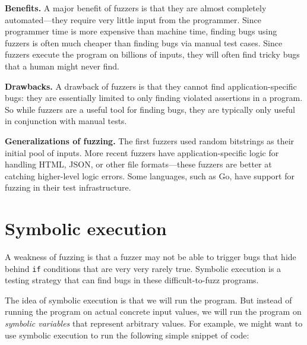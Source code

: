 \documentclass[
  letterpaper,
]{scrbook}
\theoremstyle{definition}
\theoremstyle{plain}
\theoremstyle{plain}
\theoremstyle{remark}
\begin{document}
\textbf{Benefits.} A major benefit of fuzzers is that they are almost
completely automated---they require very little input from the
programmer. Since programmer time is more expensive than machine time,
finding bugs using fuzzers is often much cheaper than finding bugs via
manual test cases. Since fuzzers execute the program on billions of
inputs, they will often find tricky bugs that a human might never find.

\textbf{Drawbacks.} A drawback of fuzzers is that they cannot find
application-specific bugs: they are essentially limited to only finding
violated assertions in a program. So while fuzzers are a useful tool for
finding bugs, they are typically only useful in conjunction with manual
tests.

\textbf{Generalizations of fuzzing.} The first fuzzers used random
bitstrings as their initial pool of inputs. More recent fuzzers have
application-specific logic for handling HTML, JSON, or other file
formats---these fuzzers are better at catching higher-level logic
errors. Some languages, such as Go, have support for fuzzing in their
test infrastructure.

\section{Symbolic execution}\label{symbolic-execution}

A weakness of fuzzing is that a fuzzer may not be able to trigger bugs
that hide behind \texttt{if} conditions that are very very rarely true.
Symbolic execution is a testing strategy that can find bugs in these
difficult-to-fuzz programs.


The idea of symbolic execution is that we will run the program. But
instead of running the program on actual concrete input values, we will
run the program on \emph{symbolic variables} that represent arbitrary
values. For example, we might want to use symbolic execution to run the
following simple snippet of code:
\end{document}

